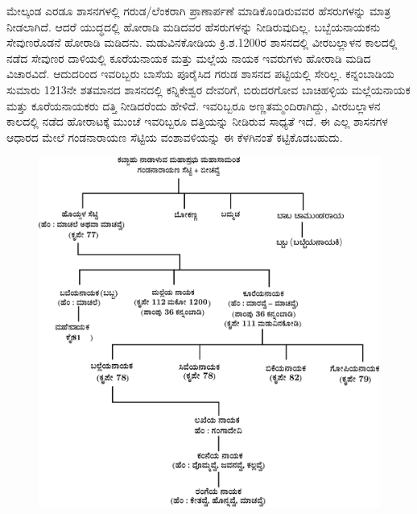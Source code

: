 ಮೇಲ್ಕಂಡ ಎರಡೂ ಶಾಸನಗಳಲ್ಲಿ ಗರುಡ/ಲೆಂಕರಾಗಿ ಪ್ರಾಣಾರ್ಪಣೆ ಮಾಡಿಕೊಂಡಿರುವವರ ಹೆಸರುಗಳನ್ನು ಮಾತ್ರ ನೀಡಲಾಗಿದೆ. ಆದರೆ ಯುದ್ಧದಲ್ಲಿ ಹೋರಾಡಿ ಮಡಿದವರ ಹೆಸರುಗಳನ್ನು ನೀಡಿರುವುದಿಲ್ಲ. ಬಬ್ಬೆಯನಾಯಕನು ಸೇವುಣರೊಡನೆ ಹೋರಾಡಿ ಮಡಿದನು. ಮಡುವಿನಕೋಡಿಯ ಕ್ರಿ.ಶ.1200ರ ಶಾಸನದಲ್ಲಿ ವೀರಬಲ್ಲಾಳನ ಕಾಲದಲ್ಲಿ ನಡೆದ ಸೇವುಣರ ದಾಳಿಯಲ್ಲಿ ಕೂರೆಯನಾಯಕ ಮತ್ತು ಮಲ್ಲೆಯ ನಾಯಕ ಇವರುಗಳು ಹೋರಾಡಿ ಮಡಿದ ವಿಚಾರವಿದೆ. ಆದುದರಿಂದ ಇವರಿಬ್ಬರು ಬಾಸೆಯ ಪೂರೈಸಿದ ಗರುಡ ಶಾಸನದ ಪಟ್ಟಿಯಲ್ಲಿ ಸೇರಿಲ್ಲ. ಕನ್ನಂಬಾಡಿಯ ಸುಮಾರು 12\enginline{-}13ನೇ ಶತಮಾನದ ಶಾಸನದಲ್ಲಿ ಕನ್ನಿಕೇಶ್ವರ ದೇವರಿಗೆ, ಬಿರುದರಗೋವ ಬಾಚಿಹಳ್ಳಿಯ ಮಲ್ಲೆಯನಾಯಕ ಮತ್ತು ಕೂರೆಯನಾಯಕರು ದತ್ತಿ ನೀಡಿದರೆಂದು ಹೇಳಿದೆ. ಇವರಿಬ್ಬರೂ ಅಣ್ಣತಮ್ಮಂದಿರಾಗಿದ್ದು, ವೀರಬಲ್ಲಾಳನ ಕಾಲದಲ್ಲಿ ನಡೆದ ಹೋರಾಟಕ್ಕೆ ಮುಂಚೆ ಇವರಿಬ್ಬರೂ ದತ್ತಿಯನ್ನು ನೀಡಿರುವ ಸಾಧ್ಯತೆ ಇದೆ. ಈ ಎಲ್ಲ ಶಾಸನಗಳ ಆಧಾರದ ಮೇಲೆ ಗಂಡನಾರಾಯಣ ಸೆಟ್ಟಿಯ ವಂಶಾವಳಿಯನ್ನು ಈ ಕೆಳಗಿನಂತೆ ಕಟ್ಟಿಕೊಡಬಹುದು.

\begin{figure}[!h]
\includegraphics[scale=1]{images/chap3/chap3fig4.jpeg}
\end{figure}

